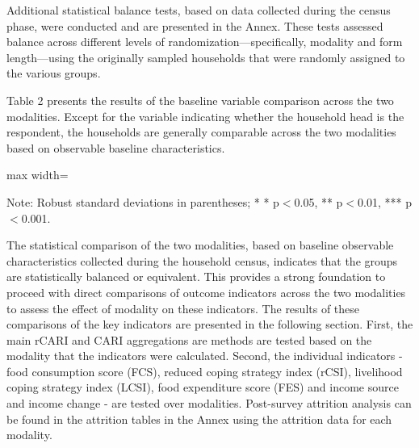 \documentclass[11pt,harvard]{article}
\begin{document}
	Additional statistical balance tests, based on data collected during the census phase, were conducted and are presented in the Annex. These tests assessed balance across different levels of randomization—specifically, modality and form length—using the originally sampled households that were randomly assigned to the various groups. 
	
	Table 2 presents the results of the baseline variable comparison across the two modalities. Except for the variable indicating whether the household head is the respondent, the households are generally comparable across the two modalities based on observable baseline characteristics.  
	
	\begin{table}[htbp]
		\centering
		\begin{adjustbox}{max width=\textwidth}
			\begin{threeparttable}
				\caption{Balance Table by Randomized Survey Modality: Face-to-Face vs. Remote for Completed Surveys}
				\scriptsize
				 
				\label{tab:BF_Completed_Demo_Balance_Modality}
				\begin{tablenotes}
					\item Note: Robust standard deviations in parentheses; * * p$<$0.05, ** p$<$0.01, *** p$<$0.001. 
				\end{tablenotes}
			\end{threeparttable}
		\end{adjustbox}
	\end{table}
	
	The statistical comparison of the two modalities, based on baseline observable characteristics collected during the household census, indicates that the groups are statistically balanced or equivalent. This provides a strong foundation to proceed with direct comparisons of outcome indicators across the two modalities to assess the effect of modality on these indicators. 
	The results of these comparisons of the key indicators are presented in the following section. First, the main rCARI and CARI aggregations are methods are tested based on the modality that the indicators were calculated. Second, the individual indicators - food consumption score (FCS), reduced coping strategy index (rCSI), livelihood coping strategy index (LCSI), food expenditure score (FES) and income source and income change - are tested over modalities. Post-survey attrition analysis can be found in the attrition tables in the Annex using the attrition data for each modality.
	
\end{document}
